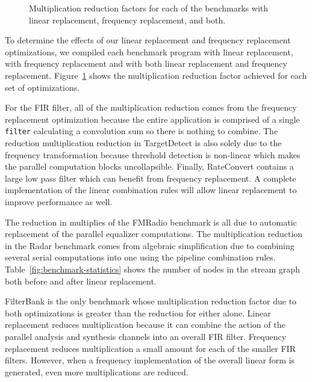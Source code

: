 
\begin{figure}
\center
\epsfxsize=3.2in
\vspace{-6pt}
\caption{Multiplication reduction factors for each of the benchmarks with linear replacement, frequency replacement, and both.}
\label{fig:linear-freq-both}
\vspace{-12pt}
\end{figure}

To determine the effects of our linear replacement and frequency replacement 
optimizations, we compiled each benchmark program with linear 
replacement, with frequency replacement and with both linear 
replacement and frequency replacement. 
Figure~\ref{fig:linear-freq-both} shows the multiplication reduction factor 
achieved for each set of optimizations.

For the FIR filter, all of the multiplication reduction comes from the frequency
replacement optimization because the entire application is comprised of a single
{\tt filter} calculating a convolution sum so there is nothing to combine.
The reduction multiplication reduction in TargetDetect is also solely due to 
the frequency transformation because threshold detection is non-linear which
makes the parallel computation blocks uncollapsible. Finally, RateConvert contains
a large low pass filter which can benefit from frequency replacement. A complete
implementation of the linear combination rules will allow linear replacement 
to improve performance as well.

The reduction in multiplies of the FMRadio benchmark is all due to
automatic replacement of the parallel equalizer computations.
The multiplication reduction in the Radar benchmark comes from algebraic  
simplification due to combining several serial computations into one using
the pipeline combination rules. Table~\ref{fig:benchmark-statistics} shows
the number of nodes in the stream graph both before and after linear replacement. 

FilterBank is the only benchmark whose multiplication reduction factor due to both optimizations
is greater than the reduction for either alone. Linear replacement reduces
multiplication because it can combine the action of the parallel analysis 
and synthesis channels into an overall FIR filter. Frequency replacement reduces
multiplication a small amount for each of the smaller FIR filters. However, when
a frequency implementation of the overall linear form is generated,
even more multiplications are reduced.

